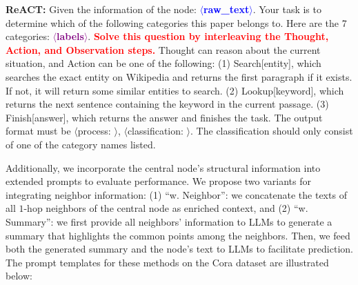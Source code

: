 \begin{tcolorbox}[colback=gray!10, colframe=black, boxrule=1pt, arc=2pt, left=5pt, right=5pt]
 \textbf{ReACT: }{
Given the information of the node: \textcolor{blue}{\textbf{$\langle$raw\_text$\rangle$}}. Your task is to determine which of the following categories this paper belongs to. 
Here are the 7 categories: \textcolor{purple}{\textbf{$\langle$labels$\rangle$}}.
\textcolor{red}{\textbf{Solve this question by interleaving the Thought, Action, and Observation steps.}} Thought can reason about the current situation, and Action can be one of the following:
(1) Search[entity], which searches the exact entity on Wikipedia and returns the first paragraph if it exists. If not, it will return some similar entities to search.
(2) Lookup[keyword], which returns the next sentence containing the keyword in the current passage.
(3) Finish[answer], which returns the answer and finishes the task.
The output format must be $\langle$process: $\rangle$, $\langle$classification: $\rangle$. The classification should only consist of one of the category names listed.
}
\end{tcolorbox}


Additionally, we incorporate the central node's structural information into extended prompts to evaluate performance. We propose two variants for integrating neighbor information: (1) ``w. Neighbor'': we concatenate the texts of all $1$-hop neighbors of the central node as enriched context, and (2) ``w. Summary'': we first provide all neighbors' information to LLMs to generate a summary that highlights the common points among the neighbors. Then, we feed both the generated summary and the node's text to LLMs to facilitate prediction. The prompt templates for these methods on the Cora dataset are illustrated below:


